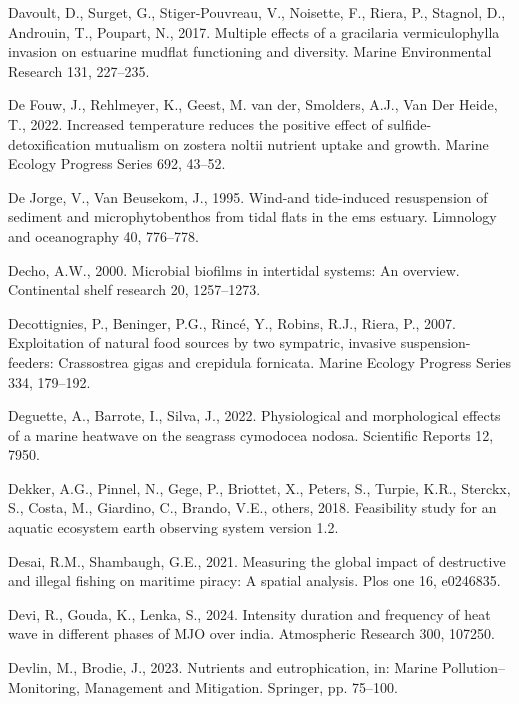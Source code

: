 \documentclass[
  letterpaper,
  11pt,
  english,
  singlespacing,
  headsepline]{MastersDoctoralThesis}
\newlength{\cslhangindent}
\newenvironment{CSLReferences}[2] %
 {\begin{list}{}{%
  \setlength{\itemindent}{0pt}
  \setlength{\leftmargin}{0pt}
  \setlength{\parsep}{0pt}
  \ifodd #1
   \setlength{\leftmargin}{\cslhangindent}
   \setlength{\itemindent}{-1\cslhangindent}
  \fi
  \setlength{\itemsep}{#2\baselineskip}}}
 {\end{list}}
\begin{document}
\begin{CSLReferences}{1}{0}
Davoult, D., Surget, G., Stiger-Pouvreau, V., Noisette, F., Riera, P.,
Stagnol, D., Androuin, T., Poupart, N., 2017. Multiple effects of a
gracilaria vermiculophylla invasion on estuarine mudflat functioning and
diversity. Marine Environmental Research 131, 227--235.

De Fouw, J., Rehlmeyer, K., Geest, M. van der, Smolders, A.J., Van Der
Heide, T., 2022. Increased temperature reduces the positive effect of
sulfide-detoxification mutualism on zostera noltii nutrient uptake and
growth. Marine Ecology Progress Series 692, 43--52.

De Jorge, V., Van Beusekom, J., 1995. Wind-and tide-induced resuspension
of sediment and microphytobenthos from tidal flats in the ems estuary.
Limnology and oceanography 40, 776--778.

Decho, A.W., 2000. Microbial biofilms in intertidal systems: An
overview. Continental shelf research 20, 1257--1273.

Decottignies, P., Beninger, P.G., Rincé, Y., Robins, R.J., Riera, P.,
2007. Exploitation of natural food sources by two sympatric, invasive
suspension-feeders: Crassostrea gigas and crepidula fornicata. Marine
Ecology Progress Series 334, 179--192.

Deguette, A., Barrote, I., Silva, J., 2022. Physiological and
morphological effects of a marine heatwave on the seagrass cymodocea
nodosa. Scientific Reports 12, 7950.

Dekker, A.G., Pinnel, N., Gege, P., Briottet, X., Peters, S., Turpie,
K.R., Sterckx, S., Costa, M., Giardino, C., Brando, V.E., others, 2018.
Feasibility study for an aquatic ecosystem earth observing system
version 1.2.

Desai, R.M., Shambaugh, G.E., 2021. Measuring the global impact of
destructive and illegal fishing on maritime piracy: A spatial analysis.
Plos one 16, e0246835.

Devi, R., Gouda, K., Lenka, S., 2024. Intensity duration and frequency
of heat wave in different phases of MJO over india. Atmospheric Research
300, 107250.

Devlin, M., Brodie, J., 2023. Nutrients and eutrophication, in: Marine
Pollution--Monitoring, Management and Mitigation. Springer, pp. 75--100.


\end{CSLReferences}
\end{document}
